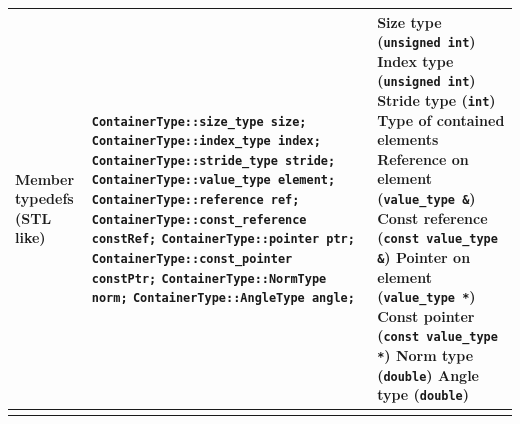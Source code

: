 \documentclass[letterpaper,10pt]{article}
\newcommand{\doublehlinethree}{\hline & & \\ [-10pt] \hline}
\begin{document}
\begin{center}
\begin{tabular}{|p{1.1in}|p{3.1in}|p{2.6in}|}
          Member \newline
          typedefs \newline
          (STL like)
          &
          \texttt{ContainerType::size\_type size;} \newline
          \texttt{ContainerType::index\_type index;} \newline
          \texttt{ContainerType::stride\_type stride;} \newline
          \texttt{ContainerType::value\_type element;} \newline
          \texttt{ContainerType::reference ref;} \newline
          \texttt{ContainerType::const\_reference constRef;} \newline
          \texttt{ContainerType::pointer ptr;} \newline
          \texttt{ContainerType::const\_pointer constPtr;} \newline
          \texttt{ContainerType::NormType norm;} \newline
          \texttt{ContainerType::AngleType angle;}
          &
          Size type (\texttt{unsigned int})\newline
          Index type (\texttt{unsigned int})\newline
          Stride type (\texttt{int}) \newline
          Type of contained elements \newline
          Reference on element (\texttt{value\_type \&}) \newline
          Const reference (\texttt{const value\_type \&}) \newline
          Pointer on element (\texttt{value\_type *}) \newline
          Const pointer (\texttt{const value\_type *}) \newline
          Norm type (\texttt{double}) \newline
          Angle type (\texttt{double})
          \\
          \doublehlinethree


\end{tabular}
\end{center}
\end{document}
